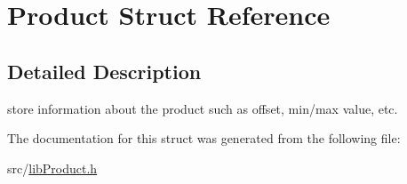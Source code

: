 \hypertarget{structProduct}{\section{Product Struct Reference}
\label{structProduct}
}


\subsection{Detailed Description}
store information about the product such as offset, min/max value, etc. 

The documentation for this struct was generated from the following file\-:\begin{DoxyCompactItemize}
\item 
src/\hyperlink{libProduct_8h}{lib\-Product.\-h}\end{DoxyCompactItemize}
